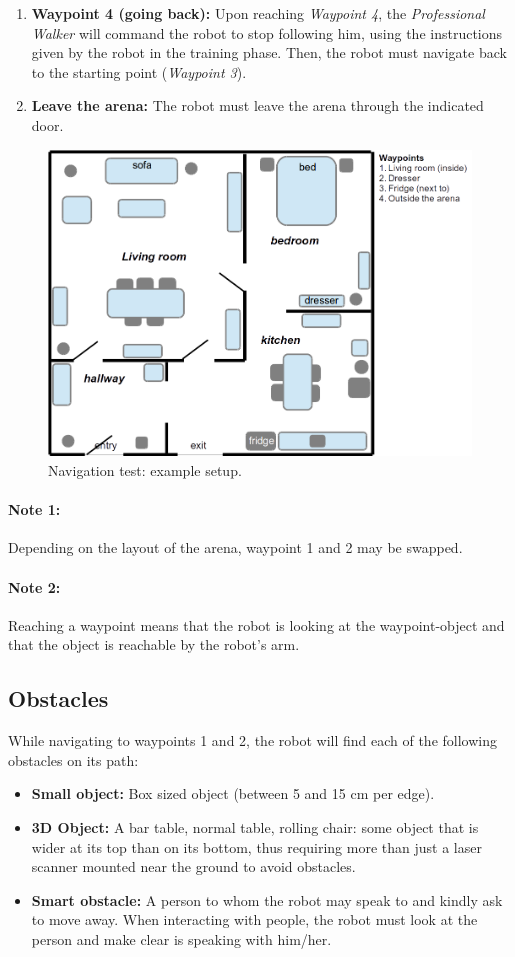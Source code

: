 \begin{enumerate}
	\item \textbf{Waypoint 4 (going back):} Upon reaching \textit{Waypoint 4}, the \textit{Professional Walker} will command the robot to stop following him, using the instructions given by the robot in the training phase. Then, the robot must navigate back to the starting point (\textit{Waypoint 3}).

	\item \textbf{Leave the arena:} The robot must leave the arena through the indicated door.
\end{enumerate}

\begin{figure}[tbp]
	\centering
	\includegraphics[width=0.5\columnwidth]{images/navigation.png}
	\caption{Navigation test: example setup.}
	\label{fig:restaurant}
\end{figure}

\paragraph*{Note 1:} Depending on the layout of the arena, waypoint 1 and 2 may be swapped.
\paragraph*{Note 2:} Reaching a waypoint means that the robot is looking at the waypoint-object and that the object is reachable by the robot's arm. 

\subsection{Obstacles}
While navigating to waypoints 1 and 2, the robot will find each of the following obstacles on its path:
\begin{itemize}
		\item \textbf{Small object:} Box sized object (between 5 and 15 cm per edge).  
		\item \textbf{3D Object:} A bar table, normal table, rolling chair: some object that is wider at its top than on its bottom, thus requiring more than just a laser scanner mounted near the ground to avoid obstacles.
		\item \textbf{Smart obstacle:} A person to whom the robot may speak to and kindly ask to move away. When interacting with people, the robot must look at the person and make clear is speaking with him/her.
	\end{itemize}

